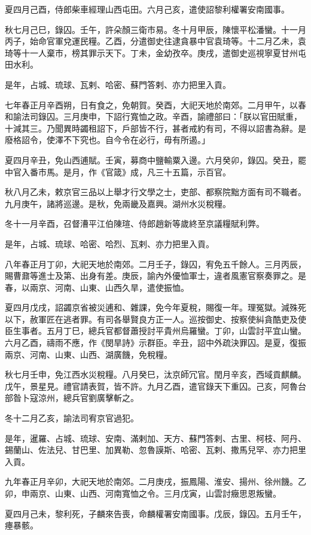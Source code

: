 \begin{pinyinscope}
夏四月己酉，侍郎柴車經理山西屯田。六月己亥，遣使詔黎利權署安南國事。

秋七月己巳，錄囚。壬午，許朵顏三衛市易。冬十月甲辰，陳懷平松潘蠻。十一月丙子，始命官軍兌運民糧。乙酉，分遣御史往逮貪暴中官袁琦等。十二月乙未，袁琦等十一人棄市，榜其罪示天下。丁未，金幼孜卒。庚戌，遣御史巡視寧夏甘州屯田水利。

是年，占城、琉球、瓦剌、哈密、蘇門答剌、亦力把里入貢。

七年春正月辛酉朔，日有食之，免朝賀。癸酉，大祀天地於南郊。二月甲午，以春和諭法司錄囚。三月庚申，下詔行寬恤之政。辛酉，諭禮部曰：「朕以官田賦重，十減其三。乃聞異時蠲租詔下，戶部皆不行，甚者戒約有司，不得以詔書為辭。是廢格詔令，使澤不下究也。自今令在必行，毋有所遏。」

夏四月辛丑，免山西逋賦。壬寅，募商中鹽輸粟入邊。六月癸卯，錄囚。癸丑，罷中官入番市馬。是月，作《官箴》成，凡三十五篇，示百官。

秋八月乙未，敕京官三品以上舉才行文學之士，吏部、都察院黜方面有司不職者。九月庚午，諸將巡邊。是秋，免兩畿及嘉興。湖州水災稅糧。

冬十一月辛酉，召督漕平江伯陳瑄、侍郎趙新等歲終至京議糧賦利弊。

是年，占城、琉球、哈密、哈烈、瓦剌、亦力把里入貢。

八年春正月丁卯，大祀天地於南郊。二月壬子，錄囚，宥免五千餘人。三月丙辰，賜曹鼐等進士及第、出身有差。庚辰，諭內外優恤軍士，違者風憲官察奏罪之。是春，以兩京、河南、山東、山西久旱，遣使振恤。

夏四月戊戌，詔蠲京省被災逋和、雜課，免今年夏稅，賜復一年。理冤獄。減殊死以下，赦軍匠在逃者罪。有司各舉賢良方正一人。巡按御史、按察使糾貪酷吏及使臣生事者。五月丁巳，總兵官都督蕭授討平貴州烏羅蠻。丁卯，山雲討平宜山蠻。六月乙酉，禱雨不應，作《閔旱詩》示群臣。辛丑，詔中外疏決罪囚。是夏，復振兩京、河南、山東、山西、湖廣饑，免稅糧。

秋七月壬申，免江西水災稅糧。八月癸巳，汰京師冗官。閏月辛亥，西域貢麒麟。戊午，景星見。禮官請表賀，皆不許。九月乙酉，遣官錄天下重囚。己亥，阿魯台部昝卜寇涼州，總兵官劉廣擊斬之。

冬十二月乙亥，諭法司宥京官過犯。

是年，暹羅、占城、琉球、安南、滿剌加、天方、蘇門答剌、古里、柯枝、阿丹、錫蘭山、佐法兒、甘巴里、加異勒、忽魯謨斯、哈密、瓦剌、撒馬兒罕、亦力把里入貢。

九年春正月辛卯，大祀天地於南郊。二月庚戌，振鳳陽、淮安、揚州、徐州饑。乙卯，申兩京、山東、山西、河南寬恤之令。三月戊寅，山雲討癥思恩叛蠻。

夏四月己未，黎利死，子麟來告喪，命麟權署安南國事。戊辰，錄囚。五月壬午，瘞暴骸。


\end{pinyinscope}
